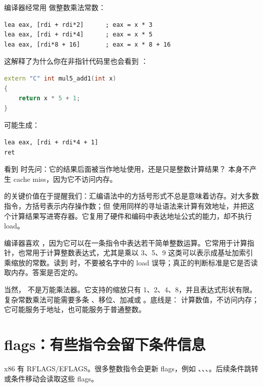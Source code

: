 编译器经常用  做整数乘法常数：

\begin{lstlisting}
lea eax, [rdi + rdi*2]      ; eax = x * 3
lea eax, [rdi + rdi*4]      ; eax = x * 5
lea eax, [rdi*8 + 16]       ; eax = x * 8 + 16
\end{lstlisting}

这解释了为什么你在非指针代码里也会看到 ：

\begin{lstlisting}[language=C++]
extern "C" int mul5_add1(int x)
{
    return x * 5 + 1;
}
\end{lstlisting}

可能生成：

\begin{lstlisting}
lea eax, [rdi + rdi*4 + 1]
ret
\end{lstlisting}

\begin{mentalmodel}
看到  时先问：它的结果后面被当作地址使用，还是只是整数计算结果？ 本身不产生 cache miss，因为它不访问内存。
\end{mentalmodel}

 的关键价值在于提醒我们：汇编语法中的方括号形式不总是意味着访存。对大多数指令，方括号表示内存操作数；但  使用同样的寻址语法来计算有效地址，并把这个计算结果写进寄存器。它复用了硬件和编码中表达地址公式的能力，却不执行 load。

编译器喜欢 ，因为它可以在一条指令中表达若干简单整数运算。它常用于计算指针，也常用于计算整数表达式，尤其是乘以 3、5、9 这类可以表示成基址加索引乘缩放的常数。读到  时，不要被名字中的 load 误导；真正的判断标准是它是否读取内存。答案是否定的。

当然， 不是万能乘法器。它支持的缩放只有 1、2、4、8，并且表达式形状有限。复杂常数乘法可能需要多条 、移位、加减或 。底线是： 计算数值，不访问内存；它可能服务于地址，也可能服务于普通整数。

\section{flags：有些指令会留下条件信息}

x86 有 RFLAGS/EFLAGS。很多整数指令会更新 flags，例如 、、、。后续条件跳转或条件移动会读取这些 flags。

